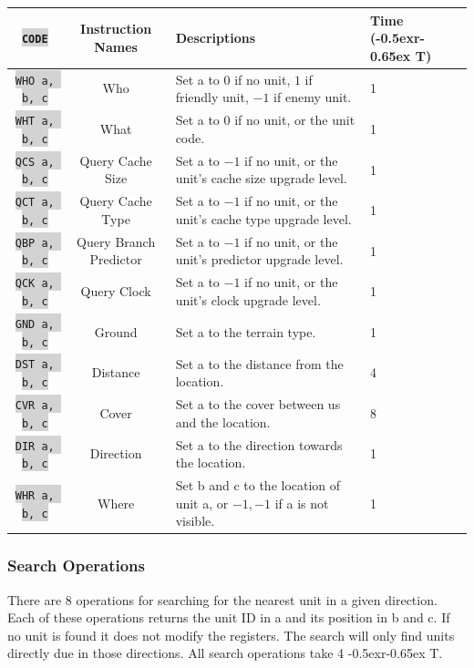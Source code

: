 \documentclass{article}
\newcommand{\vnscode}[1]{\colorbox{lightgray}{\lstinline[language=vns]{#1}}}
\newcommand{\RT}{\lower-0.5ex\hbox{r}\kern-0.65ex T}
\begin{document}
\begin{minipage}{\textwidth}
\label{table:query}
\centering
\begin{tabular}{|c|c|l|l|}
    \hline \vnscode{CODE} & Instruction Names & Descriptions & Time (\RT) \\ \hline
    \vnscode{WHO a, b, c} & Who & Set a to $0$ if no unit, $1$ if friendly unit, $-1$ if enemy unit. & 1 \\ \hline
    \vnscode{WHT a, b, c} & What & Set a to $0$ if no unit, or the unit code. & 1 \\ \hline
    \vnscode{QCS a, b, c} & Query Cache Size & Set a to $-1$ if no unit, or the unit's cache size upgrade level. & 1 \\ \hline
    \vnscode{QCT a, b, c} & Query Cache Type & Set a to $-1$ if no unit, or the unit's cache type upgrade level. & 1 \\ \hline
    \vnscode{QBP a, b, c} & Query Branch Predictor & Set a to $-1$ if no unit, or the unit's predictor upgrade level. & 1 \\ \hline
    \vnscode{QCK a, b, c} & Query Clock & Set a to $-1$ if no unit, or the unit's clock upgrade level. & 1 \\ \hline
    \vnscode{GND a, b, c} & Ground & Set a to the terrain type. & 1 \\ \hline
    \vnscode{DST a, b, c} & Distance & Set a to the distance from the location. & 4 \\ \hline
    \vnscode{CVR a, b, c} & Cover & Set a to the cover between us and the location. & 8 \\ \hline
    \vnscode{DIR a, b, c} & Direction & Set a to the direction towards the location. & 1 \\ \hline
    \vnscode{WHR a, b, c} & Where & Set b and c to the location of unit a, or $-1,-1$ if a is not visible. & 1 \\ \hline
\end{tabular}
\end{minipage}

\subsubsection{Search Operations}

There are 8 operations for searching for the nearest unit in a given direction.
Each of these operations returns the unit ID in a and its position in b and c.
If no unit is found it does not modify the registers. The search will only find
units directly due in those directions. All search operations take 4 \RT.
\end{document}

